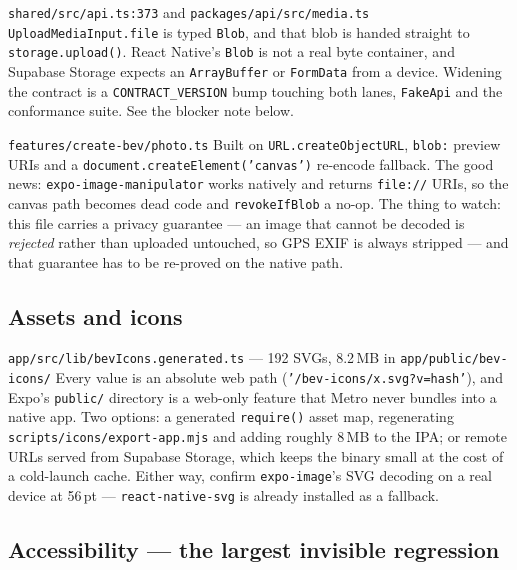 \documentclass[11pt]{article}
\newcommand{\code}[1]{\texttt{\small #1}}
\newcommand{\bk}{\discretionary{}{}{}}
\newenvironment{findings}
  {\begin{description}[style=nextline,leftmargin=1.1em,labelindent=0pt,
     itemsep=1.05em,parsep=0.3em,topsep=0.6em,font=\normalfont\color{ink}\bfseries]}
  {\end{description}}
\begin{document}
\begin{findings}

\item[\code{shared/src/api.ts:373} and \code{packages/api/src/media.ts}]
\code{UploadMediaInput.\bk file} is typed \code{Blob}, and that blob is handed straight to
\code{storage.upload()}. React Native's \code{Blob} is not a real byte container, and Supabase
Storage expects an \code{ArrayBuffer} or \code{FormData} from a device. Widening the contract is a
\code{CONTRACT\_VERSION} bump touching both lanes, \code{FakeApi} and the conformance suite. See the
blocker note below.

\item[\code{features/create-bev/photo.ts}]
Built on \code{URL.createObjectURL}, \code{blob:} preview URIs and a
\code{document.createElement('canvas')} re-encode fallback. The good news:
\code{expo-image-\bk manipulator} works natively and returns \code{file://} URIs, so the canvas path
becomes dead code and \code{revokeIfBlob} a no-op. The thing to watch: this file carries a privacy
guarantee --- an image that cannot be decoded is \emph{rejected} rather than uploaded untouched, so
GPS EXIF is always stripped --- and that guarantee has to be re-proved on the native path.

\end{findings}

\subsection{Assets and icons}

\begin{findings}

\item[\code{app/src/lib/bevIcons.\bk generated.ts} --- 192 SVGs, 8.2\,MB in
\code{app/public/bev-icons/}]
Every value is an absolute web path (\code{'/bev-icons/x.svg?v=hash'}), and Expo's \code{public/}
directory is a web-only feature that Metro never bundles into a native app. Two options: a generated
\code{require()} asset map, regenerating \code{scripts/icons/\bk export-app.mjs} and adding roughly
8\,MB to the IPA; or remote URLs served from Supabase Storage, which keeps the binary small at the
cost of a cold-launch cache. Either way, confirm \code{expo-image}'s SVG decoding on a real device at
56\,pt --- \code{react-native-svg} is already installed as a fallback.

\end{findings}

\subsection{Accessibility --- the largest invisible regression}
\end{document}
